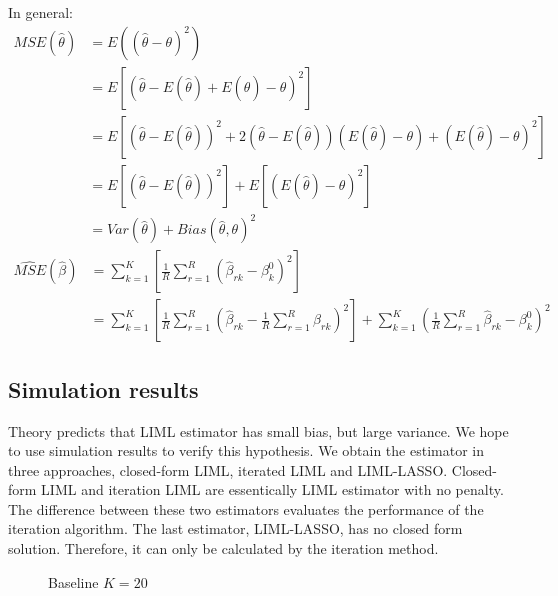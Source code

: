 \documentclass[12pt,pdftex,letterpaper]{article}
\begin{document}
In general:
\begin{align*}
MSE(\hat{\theta})&=E((\hat{\theta}-\theta)^{2})\\
                 &=E[(\hat{\theta}-E(\hat{\theta})+E(\hat{\theta})-\theta)^{2}] \\
                 &=E[(\hat{\theta}-E(\hat{\theta}))^{2}+2(\hat{\theta}-E(\hat{\theta}))(E(\hat{\theta})-\theta)+(E(\hat{\theta})-\theta)^{2}] \\
                 &=E[(\hat{\theta}-E(\hat{\theta}))^{2}]+E[(E(\hat{\theta})-\theta)^{2}] \\
                 &=Var(\hat{\theta})+Bias(\hat{\theta},\theta)^{2} 
\end{align*}
\begin{align*}
\hat{MSE}(\hat{\beta})&=\sum_{k=1}^{K}[\frac{1}{R}\sum_{r=1}^{R}(\hat{\beta}_{rk}-\beta_{k}^{0})^{2}] \\
                      &=\sum_{k=1}^{K}[\frac{1}{R}\sum_{r=1}^{R}(\hat{\beta}_{rk}-\frac{1}{R}\sum_{r=1}^{R}\hat{\beta}_{rk})^{2}]+\sum_{k=1}^{K}(\frac{1}{R}\sum_{r=1}^{R}\hat{\beta}_{rk}-\beta_{k}^{0})^{2}   
\end{align*}

\subsection{Simulation results}
\indent Theory predicts that LIML estimator has small bias, but large variance. We hope to use simulation results to verify this hypothesis. We obtain the estimator in three approaches, closed-form LIML, iterated LIML and LIML-LASSO. Closed-form LIML and iteration LIML are essentically LIML estimator with no penalty. The difference between these two estimators evaluates the performance of the iteration algorithm. The last estimator, LIML-LASSO, has no closed form solution. Therefore, it can only be calculated by the iteration method.

\begin{figure}[h]
\centering
{}
\caption{Baseline $K=20$}\label{k20}
\end{figure}
\end{document}
